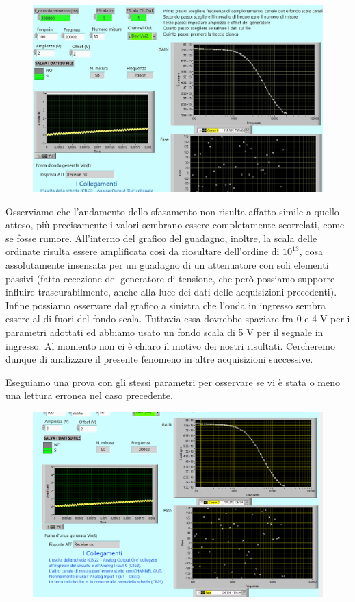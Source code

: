 \begin{figure}[H]
\caption{}
    \includegraphics[width=12cm]{settimana_2/immagini/CRRC_5.jpg}
    \centering
\end{figure}

Osserviamo che l'andamento dello sfasamento non risulta affatto simile a quello atteso, più precisamente i valori sembrano essere completamente scorrelati, come se fosse rumore. All'interno del grafico del guadagno, inoltre, la scala delle ordinate risulta essere amplificata così da riosultare dell'ordine di $10^{13}$, cosa assolutamente insensata per un guadagno di un attenuatore con soli elementi passivi (fatta eccezione del generatore di tensione, che però possiamo supporre influire trascurabilmente, anche alla luce dei dati delle acquisizioni precedenti). Infine possiamo osservare dal grafico a sinistra che l'onda in ingresso sembra essere al di fuori del fondo scala. Tuttavia essa dovrebbe spaziare fra 0 e 4 V per i parametri adottati ed abbiamo usato un fondo scala di 5 V per il segnale in ingresso. 
Al momento non ci è chiaro il motivo dei nostri risultati. Cercheremo dunque di analizzare il presente fenomeno in altre acquisizioni successive.

Eseguiamo una prova con gli stessi parametri per osservare se vi è stata o meno una lettura erronea nel caso precedente.

\begin{figure}[H]
\caption{}
    \includegraphics[width=12cm]{settimana_2/immagini/ACQUIS6pomeriggiomartediritagliatax.png}
    \centering
\end{figure}

